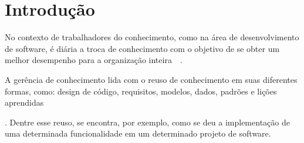 \chapter{Introdução}







No contexto de trabalhadores do conhecimento, como na área de desenvolvimento de software, é diária a troca de conhecimento com o objetivo de se obter um melhor desempenho para a organização inteira~\cite{Druker1993}~\cite{Wiig2003}. A gerência de conhecimento lida com o reuso de conhecimento em  suas diferentes formas, como: design de código, requisitos, modelos, dados, padrões e lições aprendidas~\cite{Levy2009}. Dentre esse reuso, se encontra, por exemplo, como se deu a implementação de uma determinada funcionalidade em um determinado projeto de software.





